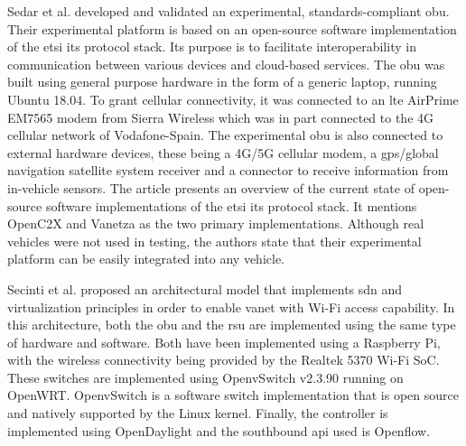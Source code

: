      
    Sedar et al.\cite{sedar_standards-compliant_2021} developed and validated an experimental, standards-compliant \gls{obu}. Their experimental platform is based on an open-source software implementation of the \gls{etsi} \gls{its} protocol stack. Its purpose is to facilitate interoperability in communication between various devices and cloud-based services.
    The \gls{obu} was built using general purpose hardware in the form of a generic laptop, running Ubuntu 18.04. To grant cellular connectivity, it was connected to an \gls{lte} AirPrime EM7565 modem from Sierra Wireless which was in part connected to the 4G cellular network of Vodafone-Spain. The experimental \gls{obu} is also connected to external hardware devices, these being a 4G/5G cellular modem, a \gls{gps}/global navigation satellite system receiver and a connector to receive information from in-vehicle sensors.
    The article presents an overview of the current state of open-source software implementations of the \gls{etsi} \gls{its} protocol stack. It mentions OpenC2X and Vanetza as the two primary implementations. 
    Although real vehicles were not used in testing, the authors state that their experimental platform can be easily integrated into any vehicle.
    
    
    Secinti et al.\cite{secinti_software_2017} proposed an architectural model that implements \gls{sdn} and virtualization principles in order to enable \gls{vanet} with Wi-Fi access capability. 
    In this architecture, both the \gls{obu} and the \gls{rsu} are implemented using the same type of hardware and software. Both have been implemented using a Raspberry Pi, with the wireless connectivity being provided by the Realtek 5370 Wi-Fi SoC.
    These switches are implemented using OpenvSwitch v2.3.90 running on OpenWRT. OpenvSwitch is a software switch implementation that is open source and natively supported by the Linux kernel\cite{noauthor_open_nodate-2}. Finally, the controller is implemented using OpenDaylight and the southbound \gls{api} used is Openflow.
    
